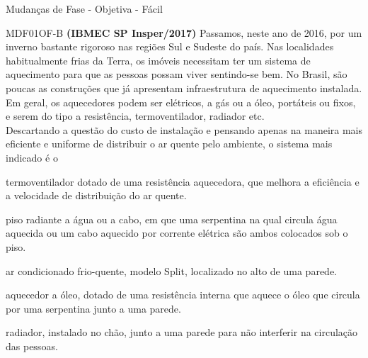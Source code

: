 \documentclass[12pt]{article}
\begin{document}
	\begin{quiz}{Mudanças de Fase - Objetiva - Fácil}
		\begin{multi}[points=1,penalty=0]{MDF01OF-B}
			\textbf{(IBMEC SP Insper/2017)} Passamos, neste ano de 2016, por um inverno bastante rigoroso nas regiões Sul e Sudeste do país. Nas localidades habitualmente frias da Terra, os imóveis necessitam ter um sistema de aquecimento para que as pessoas possam viver sentindo-se bem. No Brasil, são poucas as construções que já apresentam infraestrutura de aquecimento instalada. Em geral, os aquecedores podem ser elétricos, a gás ou a óleo, portáteis ou fixos, e serem do tipo a resistência, termoventilador, radiador etc.\\			
			Descartando a questão do custo de instalação e pensando apenas na maneira mais eficiente e uniforme de distribuir o ar quente pelo ambiente, o sistema mais indicado é o			
			\item termoventilador dotado de uma resistência aquecedora, que melhora a eficiência e a velocidade de distribuição do ar quente.
			\item* piso radiante a água ou a cabo, em que uma serpentina na qual circula água aquecida ou um cabo aquecido por corrente elétrica são ambos colocados sob o piso.
			\item ar condicionado frio-quente, modelo Split, localizado no alto de uma parede.
			\item aquecedor a óleo, dotado de uma resistência interna que aquece o óleo que circula por uma serpentina junto a uma parede.
			\item radiador, instalado no chão, junto a uma parede para não interferir na circulação das pessoas.
		\end{multi}
	

\end{quiz}
\end{document}

